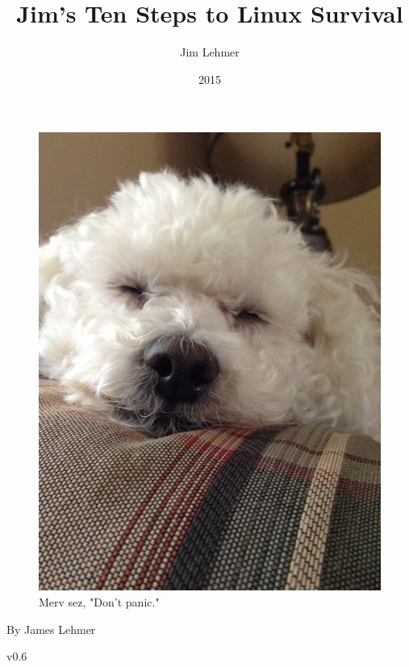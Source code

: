 \documentclass[10pt,]{book}
\title{Jim's Ten Steps to Linux Survival}
\author{Jim Lehmer}
\date{2015}
\numberwithin{figure}{chapter}
\begin{document}
\maketitle

{
\hypersetup{linkcolor=black}
\setcounter{tocdepth}{3}
\tableofcontents
}

{
\listoffigures\vfill
}

\ifxetex
\section*{} \pagestyle{empty}

\begin{figure}[H]
\includegraphics{./images/Merv.jpg}
\caption*{Merv sez, "Don't panic."}
\end{figure}

\cleardoublepage
By James Lehmer \par
v0.6 \par
\end{document}
